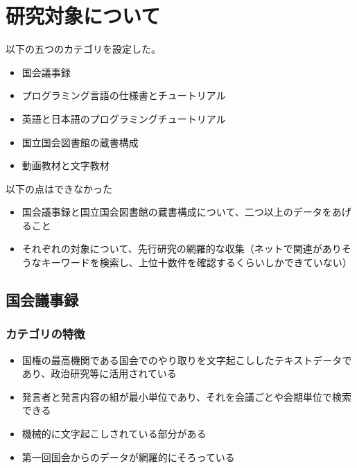 \hypertarget{ux7814ux7a76ux5bfeux8c61ux306bux3064ux3044ux3066}{%
\section{研究対象について}\label{ux7814ux7a76ux5bfeux8c61ux306bux3064ux3044ux3066}}

以下の五つのカテゴリを設定した。

\begin{itemize}
\tightlist
\item
  国会議事録
\item
  プログラミング言語の仕様書とチュートリアル
\item
  英語と日本語のプログラミングチュートリアル
\item
  国立国会図書館の蔵書構成
\item
  動画教材と文字教材
\end{itemize}

以下の点はできなかった

\begin{itemize}
\tightlist
\item
  国会議事録と国立国会図書館の蔵書構成について、二つ以上のデータをあげること
\item
  それぞれの対象について、先行研究の網羅的な収集（ネットで関連がありそうなキーワードを検索し、上位十数件を確認するくらいしかできていない）
\end{itemize}

\hypertarget{ux56fdux4f1aux8b70ux4e8bux9332}{%
\subsection{国会議事録}\label{ux56fdux4f1aux8b70ux4e8bux9332}}

\hypertarget{ux30abux30c6ux30b4ux30eaux306eux7279ux5fb4}{%
\subsubsection{カテゴリの特徴}\label{ux30abux30c6ux30b4ux30eaux306eux7279ux5fb4}}

\begin{itemize}
\tightlist
\item
  国権の最高機関である国会でのやり取りを文字起こししたテキストデータであり、政治研究等に活用されている
\item
  発言者と発言内容の組が最小単位であり、それを会議ごとや会期単位で検索できる
\item
  機械的に文字起こしされている部分がある
\item
  第一回国会からのデータが網羅的にそろっている
\end{itemize}


